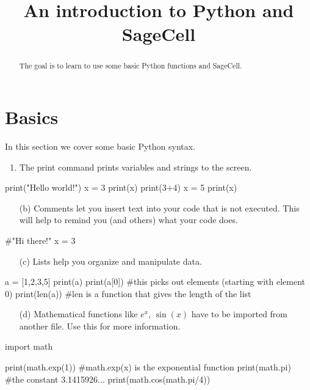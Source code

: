 \documentclass{ximera}
\title{An introduction to Python and SageCell}
\begin{document}
\begin{abstract}  
The goal is to learn to use some basic Python functions and SageCell.
\end{abstract}  
\maketitle

\section{Basics}

In this section we cover some basic Python syntax.

	\begin{enumerate}
        	\item The print command prints variables and strings to the screen.
	\end{enumerate}
\begin{sageCell}
print("Hello world!")
x = 3
print(x)
print(3+4)
x = 5
print(x)
\end{sageCell}

	\begin{enumerate}
		\item[(b)] Comments let you insert text into your code that is not executed. This will help to remind you (and others) what your code does.
	\end{enumerate}
\begin{sageCell}
#"Hi there!"
x = 3
\end{sageCell}

	\begin{enumerate}
		\item[(c)] Lists help you organize and manipulate data.
	\end{enumerate}
\begin{sageCell}
a = [1,2,3,5]
print(a)
print(a[0])   #this picks out elements (starting with element 0)
print(len(a)) #len is a function that gives the length of the list
\end{sageCell}

	\begin{enumerate}
		\item[(d)] Mathematical functions like $e^x$, $\sin(x)$ have to be imported from another file. Use this  for more information.
	\end{enumerate}
\begin{sageCell}
import math

print(math.exp(1))   #math.exp(x) is the exponential function
print(math.pi)       #the constant 3.1415926...
print(math.cos(math.pi/4))
\end{sageCell}
\end{document}
